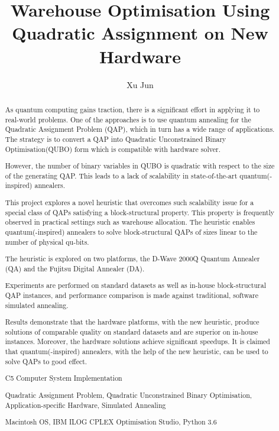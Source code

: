\documentclass[hyp]{socreport}
\begin{document}
\title{Warehouse Optimisation Using Quadratic Assignment on New Hardware}
\author{Xu Jun}
\maketitle
\begin{abstract}
As quantum computing gains traction, there is a significant effort in applying it to real-world problems. One of the approaches is to use quantum annealing for the Quadratic Assignment Problem (QAP), which in turn has a wide range of applications. The strategy is to convert a QAP into Quadratic Unconstrained Binary Optimisation(QUBO) form which is compatible with hardware solver.

However, the number of binary variables in QUBO is quadratic with respect to the size of the generating QAP. This leads to a lack of scalability in state-of-the-art quantum(-inspired) annealers. 

This project explores a novel heuristic that overcomes such scalability issue for a special class of QAPs satisfying a block-structural property. This property is frequently observed in practical settings such as warehouse allocation. The heuristic enables quantum(-inspired) annealers to solve block-structural QAPs of sizes linear to the number of physical qu-bits.

The heuristic is explored on two platforms, the D-Wave 2000Q Quantum Annealer (QA) and the Fujitsu Digital Annealer (DA).

Experiments are performed on standard datasets as well as in-house block-structural QAP instances, and performance comparison is made against traditional, software simulated annealing.

Results demonstrate that the hardware platforms, with the new heuristic, produce solutions of comparable quality on standard datasets and are superior on in-house instances. Moreover, the hardware solutions achieve significant speedups. It is claimed that quantum(-inspired) annealers, with the help of the new heuristic, can be used to solve QAPs to good effect.


\begin{descriptors}
    \item C5 Computer System Implementation
\end{descriptors}
\begin{keywords}
	Quadratic Assignment Problem, Quadratic Unconstrained Binary Optimisation, Application-specific Hardware, Simulated Annealing
\end{keywords}
\begin{implement}
	Macintosh OS, IBM ILOG CPLEX Optimisation Studio, Python 3.6
\end{implement}
\end{abstract}
\end{document}
